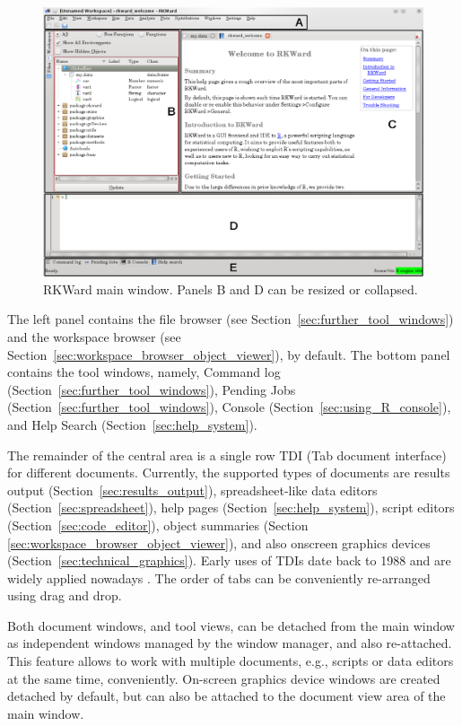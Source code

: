 \begin{figure}[htp]
 \centering
 \includegraphics[width=15.5cm]{../figures/main_window.png}
 \caption{RKWard main window. Panels B and D can be resized or collapsed.}
 \label{fig:main_window}
\end{figure}

The left panel contains the file browser (see Section~\ref{sec:further_tool_windows}) and the
workspace browser (see Section~\ref{sec:workspace_browser_object_viewer}), by default. The
bottom panel contains the tool windows, namely, Command
log (Section~\ref{sec:further_tool_windows}), Pending Jobs (Section~\ref{sec:further_tool_windows}),  Console
(Section~\ref{sec:using_R_console}), and Help Search (Section~\ref{sec:help_system}).

The remainder of the central area is a single row TDI (Tab document
interface) for different documents. Currently, the supported types of
documents are results output (Section~\ref{sec:results_output}), spreadsheet-like data editors
(Section~\ref{sec:spreadsheet}), help pages (Section~\ref{sec:help_system}), script editors (Section~\ref{sec:code_editor}),
object summaries (Section \ref{sec:workspace_browser_object_viewer}), and also
 onscreen graphics devices (Section~\ref{sec:technical_graphics}). Early uses of TDIs date back to 1988 and are
widely applied nowadays \citep{Hopkins2005, MDN2010,
KimLutteroth2010}. The order of tabs can be conveniently re-arranged
using drag and drop.

Both document windows, and tool views, can be detached from the main
window as independent windows managed by the window manager, and also
re-attached. This feature allows to work with multiple documents, e.g.,
scripts or data editors at the same time, conveniently. On{}-screen
graphics device windows are created detached by default, but can also
be attached to the document view area of the main window.

